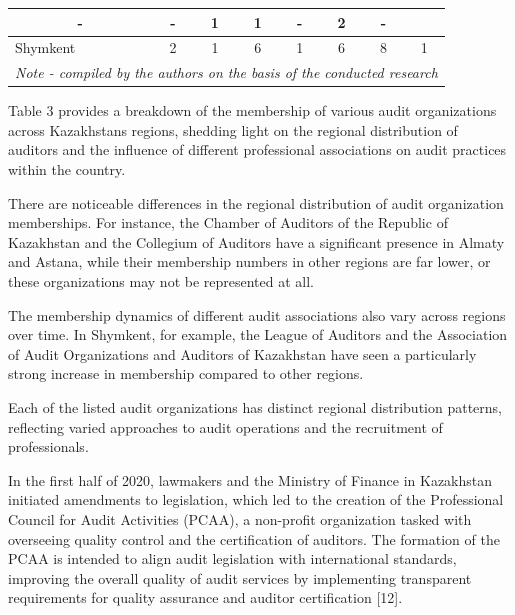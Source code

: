 \begin{table}[H]
{\begin{tabular}{|lccccccc|}
  \multicolumn{1}{c|}{-} &
  \multicolumn{1}{c|}{-} &
  \multicolumn{1}{c|}{1} &
  \multicolumn{1}{c|}{1} &
  \multicolumn{1}{c|}{-} &
  \multicolumn{1}{c|}{2} &
  - \\ \hline
\multicolumn{1}{|l|}{Shymkent} &
  \multicolumn{1}{c|}{2} &
  \multicolumn{1}{c|}{1} &
  \multicolumn{1}{c|}{6} &
  \multicolumn{1}{c|}{1} &
  \multicolumn{1}{c|}{6} &
  \multicolumn{1}{c|}{8} &
  1 \\ \hline
\multicolumn{8}{|l|}{\textit{Note - compiled by the authors on the basis of the conducted research}} \\ \hline
\end{tabular}%
}
\end{table}

\begin{multicols}{2}
Table 3 provides a breakdown of the membership of various audit
organizations across Kazakhstan\textquotesingle s regions, shedding
light on the regional distribution of auditors and the influence of
different professional associations on audit practices within the
country.

There are noticeable differences in the regional distribution of audit
organization memberships. For instance, the Chamber of Auditors of the
Republic of Kazakhstan and the Collegium of Auditors have a significant
presence in Almaty and Astana, while their membership numbers in other
regions are far lower, or these organizations may not be represented at
all.

The membership dynamics of different audit associations also vary across
regions over time. In Shymkent, for example, the League of Auditors and
the Association of Audit Organizations and Auditors of Kazakhstan have
seen a particularly strong increase in membership compared to other
regions.

Each of the listed audit organizations has distinct regional
distribution patterns, reflecting varied approaches to audit operations
and the recruitment of professionals.

In the first half of 2020, lawmakers and the Ministry of Finance in
Kazakhstan initiated amendments to legislation, which led to the
creation of the Professional Council for Audit Activities (PCAA), a
non-profit organization tasked with overseeing quality control and the
certification of auditors. The formation of the PCAA is intended to
align audit legislation with international standards, improving the
overall quality of audit services by implementing transparent
requirements for quality assurance and auditor certification {[}12{]}.


\end{multicols}
